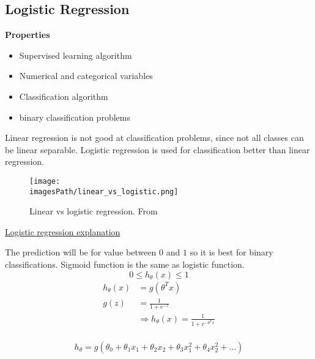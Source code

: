 \begin{multicols}{2}

\section{Logistic Regression}
\textbf{Properties}
\begin{itemize}
    \item Supervised learning algorithm
    \item Numerical and categorical variables 
    \item Classification algorithm
    \item binary classification problems 
\end{itemize}

Linear regression is not good at classification problems, since not all classes can 
be linear separable. Logistic regression is used for classification better than linear regression.
\begin{figure}[H]
    \centering
    \texttt{[image: \\imagesPath/linear\_vs\_logistic.png]}
    \caption{Linear vs logistic regression. From \cite{iml}}
\end{figure}
\href{https://www.youtube.com/watch?v=-la3q9d7AKQ}{Logistic regression explanation}

The prediction will be for value between $0$ and $1$ so it is best 
for binary classifications. Sigmoid function is the same as logistic function.
\begin{equation*}
    0 \leq h_{\theta}(x) \leq 1
\end{equation*}
\begin{align*}
    h_{\theta}(x) &= g(\theta^T x) \\
    g(z) &= \frac{1}{1+e^{-z}} \\
    &\Rightarrow h_{\theta}(x) = \frac{1}{1+e^{-\theta^T x}} \\
\end{align*}



\begin{equation*}
    h_{\theta} = g(\theta_0 + \theta_1 x_1 + \theta_2 x_2 + \theta_3 x_1^2 + \theta_4 x_2^2 + \ldots)
\end{equation*}


\end{multicols}
